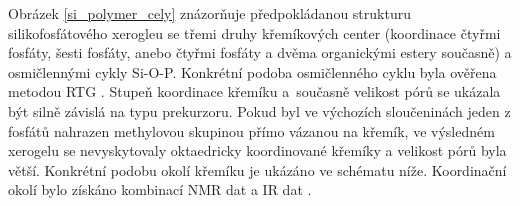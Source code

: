 \documentclass[
  digital, %
  table,   %
  lof,     %
  lot,     %
  oneside,
]{fithesis3}
\begin{document}
  Obrázek \ref{si_polymer_cely} znázorňuje předpokládanou strukturu silikofosfátového xerogleu se třemi druhy křemíkových center (koordinace čtyřmi fosfáty, šesti fosfáty, anebo čtyřmi fosfáty a dvěma organickými estery současně) a osmičlennými cykly Si-O-P.  Konkrétní podoba osmičlenného cyklu byla ověřena metodou RTG \cite{C4TA06823H}. Stupeň koordinace křemíku a~současně velikost pórů se ukázala být silně závislá na typu prekurzoru. Pokud byl ve výchozích sloučeninách jeden z fosfátů nahrazen methylovou skupinou přímo vázanou na křemík, ve výsledném xerogelu se nevyskytovaly oktaedricky koordinované křemíky a velikost pórů byla větší. Konkrétní podobu okolí křemíku je ukázáno ve schématu níže. Koordinační okolí bylo získáno kombinací NMR dat a IR dat \cite{C4TA06823H}.
  \begin{center}
    \end{center}
\end{document}
